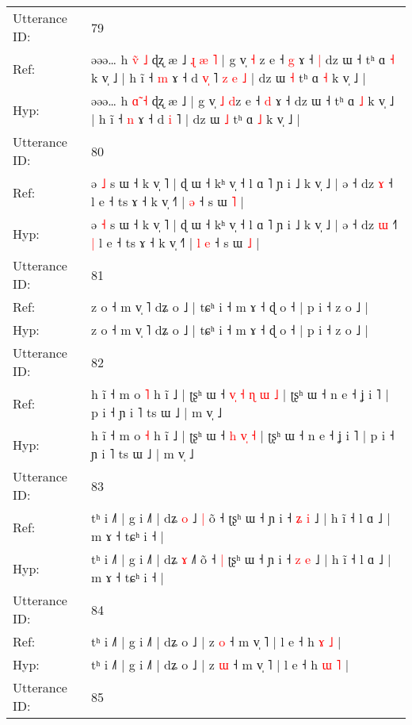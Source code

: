 \documentclass[10pt]{article}
\DeclareRobustCommand{\hl}[1]{{\textcolor{red}{#1}}}
\begin{document}
\begin{longtable}{ll}
Utterance ID: & 79 \\
Ref: & əəə… h \hl{v}̃ \hl{˩} ɖʐ æ ˩\hl{ }\hl{ɻ}\hl{ }\hl{æ}\hl{ }\hl{˥} | g v̩ \hl{˧} \hl{}z e ˧ \hl{g} ɤ ˧\hl{ }\hl{|} dz ɯ ˧ tʰ ɑ \hl{˧} k v̩ ˩ | h ĩ ˧ \hl{m} ɤ ˧ d \hl{v}\hl{̩} ˥\hl{ }\hl{z}\hl{ }\hl{e}\hl{ }\hl{˩} | dz ɯ \hl{˧} tʰ ɑ \hl{˧} k v̩ ˩ |
 \\
Hyp: & əəə… h \hl{ɑ}̃ \hl{˧} ɖʐ æ ˩\hl{}\hl{}\hl{}\hl{}\hl{}\hl{} | g v̩ \hl{˩} \hl{d}z e ˧ \hl{d} ɤ ˧\hl{}\hl{} dz ɯ ˧ tʰ ɑ \hl{˩} k v̩ ˩ | h ĩ ˧ \hl{n} ɤ ˧ d \hl{}\hl{i} ˥\hl{}\hl{}\hl{}\hl{}\hl{}\hl{} | dz ɯ \hl{˩} tʰ ɑ \hl{˩} k v̩ ˩ |
 \\
\midrule
Utterance ID: & 80 \\
Ref: & ə \hl{˩} s ɯ ˧ k v̩ ˥ | ɖ ɯ ˧ kʰ v̩ ˧ l ɑ ˥ ɲ i ˩ k v̩ ˩ | ə ˧ dz \hl{ɤ} ˧\hl{}\hl{}\hl{} l e ˧ ts ɤ ˧ k v̩ ˧˥ |\hl{}\hl{} \hl{ə} ˧ s ɯ \hl{˥} |
 \\
Hyp: & ə \hl{˧} s ɯ ˧ k v̩ ˥ | ɖ ɯ ˧ kʰ v̩ ˧ l ɑ ˥ ɲ i ˩ k v̩ ˩ | ə ˧ dz \hl{ɯ} ˧\hl{˥}\hl{ }\hl{|} l e ˧ ts ɤ ˧ k v̩ ˧˥ |\hl{ }\hl{l} \hl{e} ˧ s ɯ \hl{˩} |
 \\
\midrule
Utterance ID: & 81 \\
Ref: & z o ˧ m v̩ ˥ dʑ o ˩ | tɕʰ i ˧ m ɤ ˧ ɖ o ˧ | p i ˧ z o ˩ |
 \\
Hyp: & z o ˧ m v̩ ˥ dʑ o ˩ | tɕʰ i ˧ m ɤ ˧ ɖ o ˧ | p i ˧ z o ˩ |
 \\
\midrule
Utterance ID: & 82 \\
Ref: & h ĩ ˧ m o \hl{˥} h ĩ ˩ | ʈʂʰ ɯ ˧\hl{ }\hl{v}\hl{̩} \hl{˧} \hl{ɳ}\hl{ }\hl{ɯ} \hl{˩} | ʈʂʰ ɯ ˧ n e ˧ ʝ i ˥ | p i ˧ ɲ i ˥ ts ɯ ˩ | m v̩ ˩
 \\
Hyp: & h ĩ ˧ m o \hl{˧} h ĩ ˩ | ʈʂʰ ɯ ˧\hl{}\hl{}\hl{} \hl{h} \hl{}\hl{v}\hl{̩} \hl{˧} | ʈʂʰ ɯ ˧ n e ˧ ʝ i ˥ | p i ˧ ɲ i ˥ ts ɯ ˩ | m v̩ ˩
 \\
\midrule
Utterance ID: & 83 \\
Ref: & tʰ i ˩˥ | g i ˩˥ | dʑ \hl{o} ˩\hl{ }\hl{|} õ ˧\hl{}\hl{} ʈʂʰ ɯ ˧ ɲ i ˧ \hl{ʑ} \hl{i} ˩ | h ĩ ˧ l ɑ ˩ | m ɤ ˧ tɕʰ i ˧ |
 \\
Hyp: & tʰ i ˩˥ | g i ˩˥ | dʑ \hl{ɤ} ˩\hl{}\hl{˥} õ ˧\hl{ }\hl{|} ʈʂʰ ɯ ˧ ɲ i ˧ \hl{z} \hl{e} ˩ | h ĩ ˧ l ɑ ˩ | m ɤ ˧ tɕʰ i ˧ |
 \\
\midrule
Utterance ID: & 84 \\
Ref: & tʰ i ˩˥ | g i ˩˥ | dʑ o ˩ | z \hl{o} ˧ m v̩ ˥ | l e ˧ h \hl{ɤ} \hl{˩} |
 \\
Hyp: & tʰ i ˩˥ | g i ˩˥ | dʑ o ˩ | z \hl{ɯ} ˧ m v̩ ˥ | l e ˧ h \hl{ɯ} \hl{˥} |
 \\
\midrule
Utterance ID: & 85 \\

\end{longtable}
\end{document}
